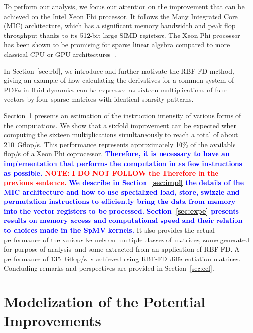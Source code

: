 \documentclass{sig-alternate}
\def\red#1{\textbf{\textcolor{red}{#1}}}
\def\blue#1{\textbf{\textcolor{blue}{#1}}}
\def\ge#1{{\blue{#1}}}
\def\NOTE#1{{\red{NOTE: #1}}}
\begin{document}
To perform our analysis, we focus our attention on the improvement
that can be achieved on the Intel Xeon Phi processor. It follows the
Many Integrated Core (MIC) architecture, which has a significant
memory bandwidth and peak flop throughput thanks to its 512-bit large
SIMD registers. The Xeon Phi processor has been shown to be promising
for sparse linear algebra compared to more classical CPU or GPU
architectures~\cite{Saule13-ARXIV, Liu:2013:ESM:2464996.2465013, cramer2012openmp}.

In Section~\ref{sec:rbf}, we introduce and further motivate the RBF-FD method, giving 
an example of how calculating the derivatives for a common system of PDEs in fluid dynamics 
can be expressed as sixteen multiplications of four vectors by four sparse matrices with 
identical sparsity patterns.

Section~\ref{sec:model} presents an
estimation of the instruction intensity of various forms of the
computations. We show that a sixfold improvement can be
expected when computing the sixteen multiplications simultaneously to
reach a total of about 210~Gflop/s. This performance represents
approximately 10\% of the available flop/s of a Xeon Phi
coprocessor. \ge{Therefore, it is necessary to have an implementation that
performs the computation in as few instructions as
possible.} \NOTE{I DO NOT FOLLOW the Therefore in the previous sentence.}
\ge{We describe in Section~\ref{sec:impl} the details of the MIC
architecture and how to use specialized load, store, swizzle and
permutation instructions to efficiently bring the data from memory into the vector
registers to be processed. Section~\ref{sec:expe} presents results on 
memory access and computational speed and their relation to choices made in the 
SpMV kernels.}
It also provides the actual performance of the various kernels on multiple classes of matrices, 
some generated for purpose of analysis, and some extracted from an application of RBF-FD. 
A performance of 135~Gflop/s is achieved using RBF-FD differentiation matrices. Concluding remarks and perspectives are provided in Section~\ref{sec:ccl}.


%

\section{Modelization of the Potential Improvements}
\label{sec:model}
\end{document}

